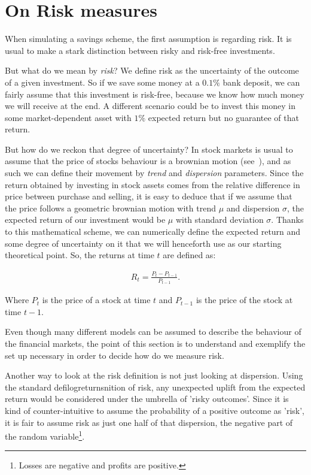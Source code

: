 \section{On Risk measures} \label{sec:risk}

When simulating a savings scheme, the first assumption is regarding risk. It is usual to make a stark distinction between risky and risk-free investments. 

But what do we mean by \textit{risk}? We define risk as the uncertainty of the outcome of a given investment. So if we save some money at a $0.1 \%$ bank deposit, we can fairly assume that this investment is risk-free, because we know how much money we will receive at the end. A different scenario could be to invest this money in some market-dependent asset with $1 \%$ expected return but no guarantee of that return. 

But how do we reckon that degree of uncertainty? In stock markets is usual to assume that the price of stocks behaviour is a brownian motion (see~\cite{b:cootner-random, a:samuelson-speculative}), and as such we can define their movement by \textit{trend} and \textit{dispersion} parameters. Since the return obtained by investing in stock assets comes from the relative difference in price between purchase and selling, it is easy to deduce that if we assume that the price follows a geometric brownian motion with trend $\mu$ and dispersion $\sigma$, the expected return of our investment would be $\mu$ with standard deviation $\sigma$. Thanks to this mathematical scheme, we can numerically define the expected return and some degree of uncertainty on it that we will henceforth use as our starting theoretical point. So, the returns at time $t$ are defined as:

\begin{align} \label{eq:return}
    R_t = \frac{P_t - P_{t-1}}{P_{t-1}}\textit{.}
\end{align}

Where $P_t$ is the price of a stock at time $t$ and $P_{t-1}$ is the price of the stock at time $t-1$.

Even though many different models can be assumed to describe the behaviour of the financial markets, the point of this section is to understand and exemplify the set up necessary in order to decide how do we measure risk.

Another way to look at the risk definition is not just looking at dispersion. Using the standard defilogreturnsnition of risk, any unexpected uplift from the expected return would be considered under the umbrella of 'risky outcomes'. Since it is kind of counter-intuitive to assume the probability of a positive outcome as 'risk', it is fair to assume risk as just one half of that dispersion, the negative part of the random variable\footnote{Losses are negative and profits are positive.}.

